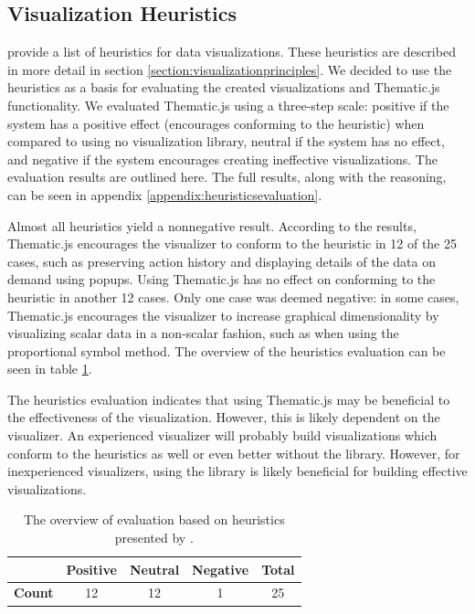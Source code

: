\subsection{Visualization Heuristics}

\citet{zuk_heuristics_2006} provide a list of heuristics for data visualizations. These heuristics are described in more detail in section \ref{section:visualizationprinciples}. We decided to use the heuristics as a basis for evaluating the created visualizations and Thematic.js functionality. We evaluated Thematic.js using a three-step scale: positive if the system has a positive effect (encourages conforming to the heuristic) when compared to using no visualization library, neutral if the system has no effect, and negative if the system encourages creating ineffective visualizations. The evaluation results are outlined here. The full results, along with the reasoning, can be seen in appendix \ref{appendix:heuristicsevaluation}.

Almost all heuristics yield a nonnegative result. According to the results, Thematic.js encourages the visualizer to conform to the heuristic in 12 of the 25 cases, such as preserving action history and displaying details of the data on demand using popups. Using Thematic.js has no effect on conforming to the heuristic in another 12 cases. Only one case was deemed negative: in some cases, Thematic.js encourages the visualizer to increase graphical dimensionality by visualizing scalar data in a non-scalar fashion, such as when using the proportional symbol method. The overview of the heuristics evaluation can be seen in table \ref{table:heuristicsevaluationoverview}.

The heuristics evaluation indicates that using Thematic.js may be beneficial to the effectiveness of the visualization. However, this is likely dependent on the visualizer. An experienced visualizer will probably build visualizations which conform to the heuristics as well or even better without the library. However, for inexperienced visualizers, using the library is likely beneficial for building effective visualizations. 

\begin{table}[h]
\centering
\begin{tabular}{|l|c|c|c|c|}
\hline
 & \textbf{Positive} & \textbf{Neutral} & \textbf{Negative} & \textbf{Total} \\ 
\hline
\textbf{Count} & 12 & 12 & 1 & 25 \\
\hline
\end{tabular}
\caption{The overview of evaluation based on heuristics presented by \citet{zuk_heuristics_2006}.}
\label{table:heuristicsevaluationoverview}
\end{table}

